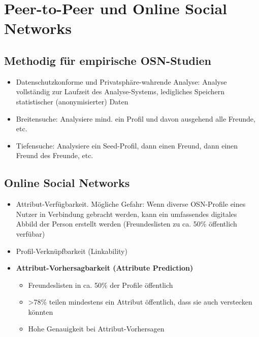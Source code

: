 \section{Peer-to-Peer und Online Social Networks}

\subsection{Methodig für empirische OSN-Studien}
\begin{itemize}
	\item Datenschutzkonforme und Privatsphäre-wahrende Analyse: Analyse vollständig zur Laufzeit des Analyse-Systems, ledigliches Speichern statistischer (anonymisierter) Daten
	\item Breitensuche: Analysiere mind. ein Profil und davon ausgehend alle Freunde, etc.
	\item Tiefensuche: Analysiere ein Seed-Profil, dann einen Freund, dann einen Freund des Freunde, etc.
\end{itemize}


\subsection{Online Social Networks}
\begin{itemize}
	\item Attribut-Verfügbarkeit. Mögliche Gefahr: Wenn diverse OSN-Profile eines Nutzer in Verbindung gebracht werden, kann ein umfassendes digitales Abbild der Person erstellt werden (Freundeslisten zu ca. 50\% öffentlich verfübar)
	\item Profil-Verknüpfbarkeit (Linkability)
	\item \textbf{Attribut-Vorhersagbarkeit (Attribute Prediction)}
	\begin{itemize}
		\item Freundeslisten in ca. 50\% der Profile öffentlich
		\item >78\% teilen mindestens ein Attribut öffentlich, dass sie auch verstecken könnten
		\item Hohe Genauigkeit bei Attribut-Vorhersagen
	\end{itemize}
\end{itemize}


